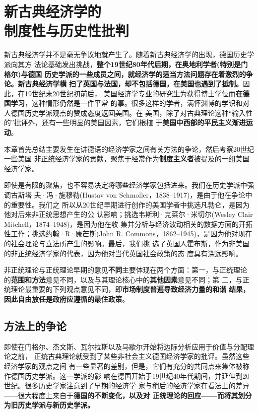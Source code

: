 \chapter{新古典经济学的\\制度性与历史性批判}

新古典经济学并不是毫无争议地就产生了。随着新古典经济学的出现，德国历史学派向其方
法论基础发出挑战，\textbf{整个19世纪80年代后期，在奥地利学者(特别是门格尔)与德国
  历史学派的一些成员之间，就经济学的适当方法问题存在着激烈的争论。新古典经济学横
  扫了英国与法国，却不包括德国，在美国也遇到了抵制。}因此，在19世纪末20世纪初前后，
美国经济学专业的研究生为获得博士学位而\textbf{在德国学习}，这种情形仍然是一件平常
的事。很多这样的学者，满怀渊博的学识和对人德国历史学派观点的赞成态度返回美国。在
美国，除了对古典理论这种“输入性的”批评外，还有一些明显的美国因素，它们根植
于\textbf{美国中西部的平民主义渐进运动}。

本章首先总结主要发生在讲德语的经济学家之间有关方法的争论，然后考察20世纪一些美国
非正统经济学家的贡献，聚焦于经常作为\textbf{制度主义者}被提及的一组美国经济学家。

即使是有限的聚焦，也不容易决定将哪些经济学家包括进来。我们在历史学派中强调古斯塔
夫·冯·施穆勒(Hustav von Schmoller，1838--1917)，是由于他在争论中的重要性。我们之
所以从20世纪早期进行创作的美国学者中挑选凡勃仑，是因为他对后来非正统思想产生的公
认影响；挑选韦斯利·克菜尔·米切尔(Wesley Clair Mitchell，1874--1948)，是因为他在收
集并分析与经济波动相关的数据方面的开拓性工作；挑选约翰·R·康芒斯(John
R. Commons，1862--1945)，是因为他对现在的社会理论与立法所产生的影响。最后，我们挑
选了英国人霍布斯，作为非美国的非正统经济学家的代表，因为他对当代英国社会政策的态
度具有深远影响。

非正统理论与正统理论早期的意见\textbf{不同}主要体现在两个方面：第一，与正统理论
的\textbf{范围和方法}意见不同，以及与其理论核心中的\textbf{其他因素}意见不同；第
二，与正统理论最重要的下列观点意见不同，即\textbf{市场制度普遍导致经济力量的和谐
  结果，因此自由放任是政府应遵循的最住政策}。

\section{方法上的争论}

即使在门格尔、杰文斯、瓦尔拉斯以及马歇尔开始将边际分析应用于价值与分配理论之前，
正统古典理论就受到了某些非社会主义德国经济学家的批评。虽然这些经济学家的观点之间
有一些显著的差别，但是，它们有充分的共同点来集体被称作德国历史学派。这一学派的影
响在德国开始于19世纪40年代期间，并延伸到20世纪。很多历史学家注意到了早期的经济学
家与稍后的经济学家在看法上的差异——很大程度上来自于\textbf{德国的不断变化，以及对
  正统理论的回应——而将其划分为旧历史学派与新历史学派。}

